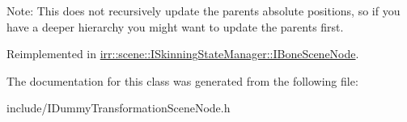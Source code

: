 Note\+: This does not recursively update the parents absolute positions, so if you have a deeper hierarchy you might want to update the parents first. 

Reimplemented in \hyperlink{classirr_1_1scene_1_1ISkinningStateManager_1_1IBoneSceneNode_a32bd793195468797fb07249946a8be21}{irr\+::scene\+::\+I\+Skinning\+State\+Manager\+::\+I\+Bone\+Scene\+Node}.



The documentation for this class was generated from the following file\+:\begin{DoxyCompactItemize}
\item 
include/I\+Dummy\+Transformation\+Scene\+Node.\+h\end{DoxyCompactItemize}
